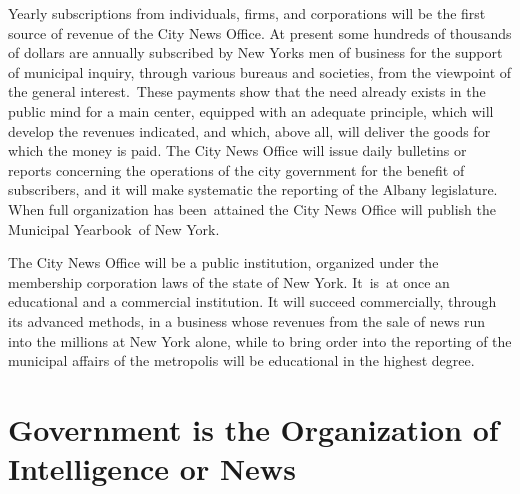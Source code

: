 \documentclass[openany,nobib]{tufte-book}
\let\oldchapter\chapter
\def\chapter{%
  \setcounter{footnote}{0}%
  \oldchapter
}
\begin{document}
\enlargethispage{\baselineskip}

Yearly subscriptions from individuals, firms, and corporations will be
the first source of revenue of the City News Office. At present some
hundreds of thousands of dollars are annually subscribed by New
York\textquotesingle s men of business for the support of municipal
inquiry, through various bureaus and societies, from the viewpoint of
the general interest.~These payments show that the need already exists
in the public mind for a main center, equipped with an adequate
principle, which will develop the revenues indicated, and which, above
all, will deliver the goods for which the money is paid. The City News
Office will issue daily bulletins or reports concerning the operations
of the city government for the benefit of subscribers, and it will make
systematic the reporting of the Albany legislature. When full
organization has been~attained the City News Office will publish the
Municipal Yearbook~of New York.~

The City News Office will be a public institution, organized under the
membership corporation laws of the state of New York. It~is~at once an
educational and a commercial institution. It will succeed commercially,
through its advanced methods, in a business whose revenues from the sale
of news run into the millions at New York alone, while to bring order
into the reporting of the municipal affairs of the metropolis will be
educational in the highest degree.~

\vspace{.05in}

\hspace{3in}{\large F. F.}

\chapter[Government is the Organization of Intelligence or News]{Government is the Organization of Intelligence or News}
\label{ch:Government is the Organization of Intelligence or News}

\vspace{.2in}

\begin{LARGE}


\end{LARGE}
\end{document}
